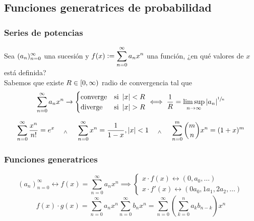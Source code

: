 \subsection{Funciones generatrices de probabilidad}
\subsubsection{Series de potencias}
Sea $\displaystyle (a_n)_{n=0}^\infty$ una sucesión y $\displaystyle f(x)\vcentcolon=\sum_{n=0}^\infty
	a_nx^n$ una función, ¿en qué valores de $x$ está definida?\\ Sabemos que existe
$\displaystyle R \in [0, \infty)$ radio de convergencia tal que
\[\sum_{n=0}^\infty a_nx^n \rightarrow \begin{cases}
		\textrm{converge} & \textrm{si } \left|x\right| < R \\
		\textrm{diverge}  & \textrm{si } \left|x\right| > R
	\end{cases} \iff \frac{1}{R}=\limsup_{n\to\infty}\left|a_n\right|^{\sfrac{1}{n}}\]
\begin{ejem}
	\[ \sum_{n=0}^\infty \frac{x^n}{n!} = e^x \quad\; _{\wedge} \;\quad \sum_{n=0}^\infty x^n = \frac{1}{1-x}, \left|x\right|<1 \quad\; _{\wedge} \;\quad \sum_{n=0}^m \binom{m}{n} x^n = (1+x)^m\]
\end{ejem}

\subsubsection{Funciones generatrices}
\[(a_n)_{n=0}^\infty \longleftrightarrow f(x)=\sum_{n=0}^\infty a_n x^n \implies \begin{cases}
		x\cdot f(x) \longleftrightarrow (0, a_0, \dots) \\
		x\cdot f'(x) \longleftrightarrow (0a_0, 1a_1, 2a_2, \dots)
	\end{cases}\]
\[f(x) \cdot g(x) = \sum_{n=0}^\infty a_n x^n \sum_{n=0}^\infty b_n x^n = \sum_{n=0}^\infty \left(\sum_{k=0}^n a_k b_{n-k}\right)x^n\]

